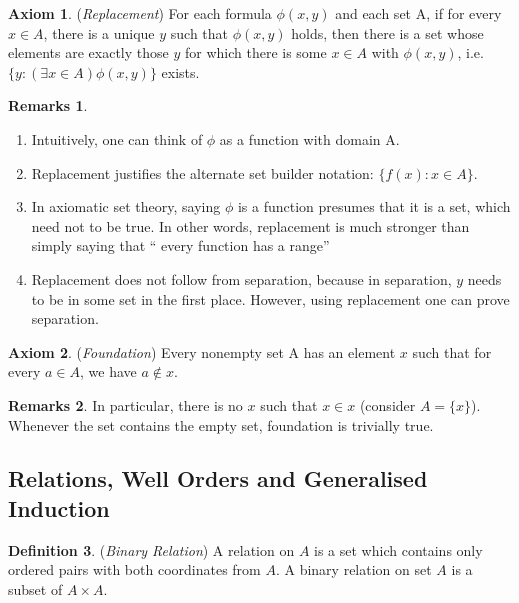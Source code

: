 \documentclass[14pt]{article}
\theoremstyle{definition}
\newtheorem*{remark}{Remarks}
\newtheorem{definition}{Definition}[subsection]
\newtheorem{axiom}[definition]{Axiom}
\begin{document}
\begin{axiom}
    (\textit{Replacement}) For each formula $\phi(x,y)$ and each set A, if for every $x\in A$, there is a unique $y$ such that $\phi(x,y)$ holds, then there is a set whose elements are exactly those $y$ for which there is some $x\in A$ with $\phi(x,y)$, i.e. $\{y:(\exists x \in  A)\phi(x,y)\}$ exists.
\end{axiom}

\begin{remark}
\hfill
\begin{enumerate}
    \item Intuitively, one can think of $\phi$ as a function with domain A.
    \item Replacement justifies the alternate set builder notation: $\{f(x):x\in A\}$.
    \item In axiomatic set theory, saying $\phi$ is a function presumes that it is a set, which need not to be true. In other words, replacement is much stronger than simply saying that “ every function has a range”
    \item Replacement does not follow from separation, because in separation,  $y$ needs to be in some set in the first place. However, using replacement one can prove separation.
\end{enumerate}
\end{remark}

\vspace{3mm}

\begin{axiom}
    (\textit{Foundation}) Every nonempty set A has an element $x$ such that for every $a\in A$, we have $a\notin x$.
\end{axiom}
\begin{remark}
    In particular, there is no $x$ such that $x\in x$ (consider $A=\{x\}$). Whenever the set contains the empty set, foundation is trivially true.
\end{remark}

\vspace{5mm}

\subsection{Relations, Well Orders and Generalised Induction}
\begin{definition}
    (\textit{Binary Relation}) A relation on $A$ is a set which contains only ordered pairs with both coordinates from $A$. A binary relation on set $A$ is a subset of $A\times A$.
\end{definition}
\end{document}
